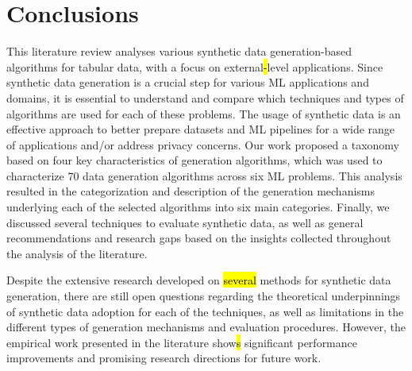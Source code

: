\section{Conclusions}\label{sec:conclusions}

This literature review analyses various synthetic data generation-based
algorithms for tabular data, with a focus on external\hl{-}level applications.
Since synthetic data generation is a crucial step for various ML applications
and domains, it is essential to understand and compare which techniques and
types of algorithms are used for each of these problems. The usage of
synthetic data is an effective approach to better prepare datasets and ML
pipelines for a wide range of applications and/or address privacy concerns.
Our work proposed a taxonomy based on four key characteristics of generation
algorithms, which was used to characterize 70 data generation algorithms
across six ML problems. This analysis resulted in the categorization and
description of the generation mechanisms underlying each of the selected
algorithms into six main categories. Finally, we discussed several techniques
to evaluate synthetic data, as well as general recommendations and research
gaps based on the insights collected throughout the analysis of the
literature.

Despite the extensive research developed on \hl{several} methods for synthetic
data generation, there are still open questions regarding the theoretical
underpinnings of synthetic data adoption for each of the techniques, as well
as limitations in the different types of generation mechanisms and evaluation
procedures. However, the empirical work presented in the literature show\hl{s}
significant performance improvements and promising research directions for
future work.
